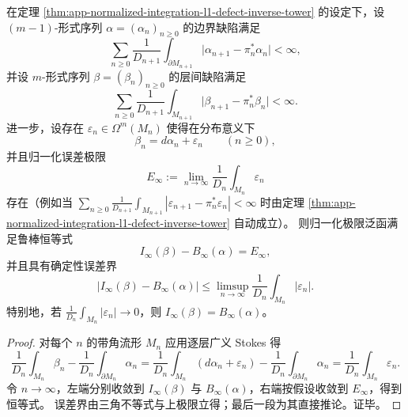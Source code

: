 \begin{corollary}[鲁棒归一化斯托克斯恒等式与缺陷预算]\label{cor:app-robust-normalized-stokes-with-defect-budget}
在定理 \ref{thm:app-normalized-integration-l1-defect-inverse-tower} 的设定下，设 \((m-1)\)-形式序列 \(\alpha=(\alpha_n)_{n\ge 0}\) 的边界缺陷满足
\[
\sum_{n\ge 0}\frac{1}{D_{n+1}}\int_{\partial M_{n+1}}\bigl|\alpha_{n+1}-\pi_n^\ast\alpha_n\bigr|<\infty,
\]
并设 \(m\)-形式序列 \(\beta=(\beta_n)_{n\ge 0}\) 的层间缺陷满足
\[
\sum_{n\ge 0}\frac{1}{D_{n+1}}\int_{M_{n+1}}\bigl|\beta_{n+1}-\pi_n^\ast\beta_n\bigr|<\infty.
\]
进一步，设存在 \(\varepsilon_n\in\Omega^m(M_n)\) 使得在分布意义下
\[
\beta_n=d\alpha_n+\varepsilon_n\qquad(n\ge 0),
\]
并且归一化误差极限
\[
E_\infty:=\lim_{n\to\infty}\frac{1}{D_n}\int_{M_n}\varepsilon_n
\]
存在（例如当 \(\sum_{n\ge 0}\frac{1}{D_{n+1}}\int_{M_{n+1}}|\varepsilon_{n+1}-\pi_n^\ast\varepsilon_n|<\infty\) 时由定理 \ref{thm:app-normalized-integration-l1-defect-inverse-tower} 自动成立）。
则归一化极限泛函满足鲁棒恒等式
\[
I_\infty(\beta)-B_\infty(\alpha)=E_\infty,
\]
并且具有确定性误差界
\[
\bigl|I_\infty(\beta)-B_\infty(\alpha)\bigr|
\le
\limsup_{n\to\infty}\frac{1}{D_n}\int_{M_n}|\varepsilon_n|.
\]
特别地，若 \(\frac{1}{D_n}\int_{M_n}|\varepsilon_n|\to 0\)，则 \(I_\infty(\beta)=B_\infty(\alpha)\)。
\end{corollary}
\begin{proof}
对每个 \(n\) 的带角流形 \(M_n\) 应用逐层广义 Stokes 得
\[
\frac{1}{D_n}\int_{M_n}\beta_n-\frac{1}{D_n}\int_{\partial M_n}\alpha_n
=
\frac{1}{D_n}\int_{M_n}(d\alpha_n+\varepsilon_n)-\frac{1}{D_n}\int_{\partial M_n}\alpha_n
=
\frac{1}{D_n}\int_{M_n}\varepsilon_n.
\]
令 \(n\to\infty\)，左端分别收敛到 \(I_\infty(\beta)\) 与 \(B_\infty(\alpha)\)，右端按假设收敛到 \(E_\infty\)，得到恒等式。
误差界由三角不等式与上极限立得；最后一段为其直接推论。证毕。
\end{proof}
